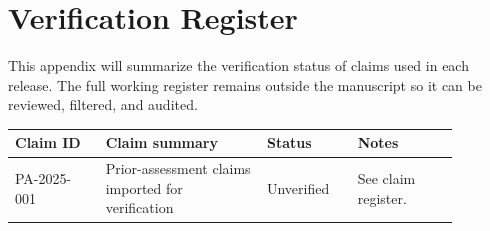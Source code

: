 \chapter{Verification Register}


This appendix will summarize the verification status of claims used in each release. The full working register remains outside the manuscript so it can be reviewed, filtered, and audited.

\begin{longtable}{p{0.18\linewidth}p{0.32\linewidth}p{0.18\linewidth}p{0.2\linewidth}}
\toprule
Claim ID & Claim summary & Status & Notes \\
\midrule
\endhead
PA-2025-001 & Prior-assessment claims imported for verification & Unverified & See claim register. \\
\bottomrule
\end{longtable}


